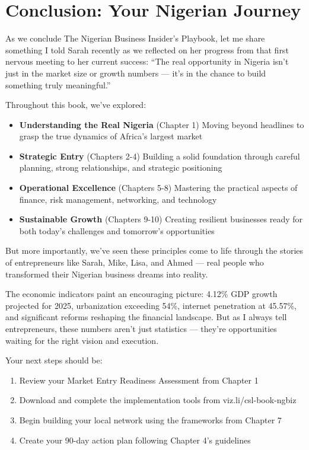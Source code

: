\section{Conclusion: Your Nigerian Journey}\label{sec:conclusion}

As we conclude The Nigerian Business Insider's Playbook, let me share something I told Sarah recently as we reflected on her progress from that first nervous meeting to her current success: ``The real opportunity in Nigeria isn't just in the market size or growth numbers --- it's in the chance to build something truly meaningful.''

Throughout this book, we've explored:

\begin{itemize}
    \item \textbf{Understanding the Real Nigeria} (Chapter 1)
    Moving beyond headlines to grasp the true dynamics of Africa's largest market

    \item \textbf{Strategic Entry} (Chapters 2-4)
    Building a solid foundation through careful planning, strong relationships, and strategic positioning

    \item \textbf{Operational Excellence} (Chapters 5-8)
    Mastering the practical aspects of finance, risk management, networking, and technology

    \item \textbf{Sustainable Growth} (Chapters 9-10)
    Creating resilient businesses ready for both today's challenges and tomorrow's opportunities
\end{itemize}

But more importantly, we've seen these principles come to life through the stories of entrepreneurs like Sarah, Mike, Lisa, and Ahmed --- real people who transformed their Nigerian business dreams into reality.

The economic indicators paint an encouraging picture: 4.12\% GDP growth projected for 2025, urbanization exceeding 54\%, internet penetration at 45.57\%, and significant reforms reshaping the financial landscape. But as I always tell entrepreneurs, these numbers aren't just statistics --- they're opportunities waiting for the right vision and execution.

Your next steps should be:

\begin{enumerate}
    \item Review your Market Entry Readiness Assessment from Chapter 1
    \item Download and complete the implementation tools from viz.li/csl-book-ngbiz
    \item Begin building your local network using the frameworks from Chapter 7
    \item Create your 90-day action plan following Chapter 4's guidelines
\end{enumerate}

